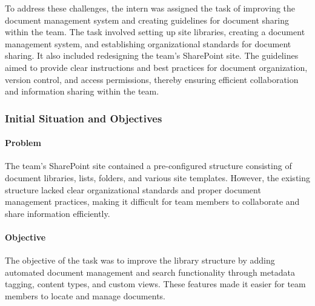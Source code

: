 To address these challenges, the intern was assigned the task of improving the document management system and creating guidelines for document sharing within the team. The task involved setting up site libraries, creating a document management system, and establishing organizational standards for document sharing. It also included redesigning the team's SharePoint site. The guidelines aimed to provide clear instructions and best practices for document organization, version control, and access permissions, thereby ensuring efficient collaboration and information sharing within the team.

\subsubsection{Initial Situation and Objectives}

\paragraph{Problem}

The team's SharePoint site contained a pre-configured structure consisting of document libraries, lists, folders, and various site templates. However, the existing structure lacked clear organizational standards and proper document management practices, making it difficult for team members to collaborate and share information efficiently.

\paragraph{Objective}

The objective of the task was to improve the library structure by adding automated document management and search functionality through metadata tagging, content types, and custom views. These features made it easier for team members to locate and manage documents.



